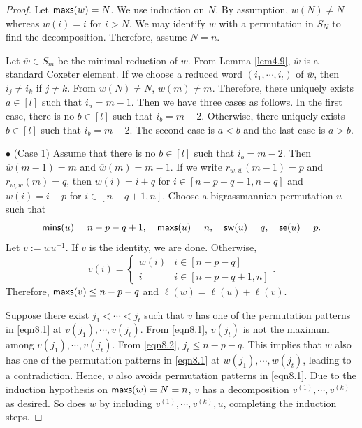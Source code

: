 \documentclass[12pt]{amsart}
\theoremstyle{definition}
\theoremstyle{remark}
\begin{document}
\begin{proof}
Let ${\sf maxs}(w) = N$. We use induction on $N$. By assumption, $w(N) \neq N$ whereas $w(i)= i$ for $i > N$. We may identify $w$ with a permutation in $S_N$ to find the decomposition. Therefore, assume $N = n$.

Let $\overline{w} \in S_m$ be the minimal reduction of $w$. From Lemma \ref{lem4.9}, $\overline{w}$ is a standard Coxeter element. If we choose a reduced word $(i_1 , \cdots , i_l)$ of $\overline{w}$, then $i_j \neq i_k$ if $j \neq k$. From $w(N) \neq N$, $w(m) \neq m$. Therefore, there uniquely exists $a \in [l]$ such that $i_a = m-1$. Then we have three cases as follows. In the first case, there is no $b \in [l]$ such that $i_b = m-2$. Otherwise, there uniquely exists $b \in [l]$ such that $i_b = m-2$. The second case is $a < b$ and the last case is $a > b$.

$\bullet$ (Case 1) Assume that there is no $b \in [l]$ such that $i_b = m-2$. Then $\overline{w}(m-1) = m$ and $\overline{w} (m) = m-1$. If we write $r_{w , \overline{w}} (m-1) = p$ and $r_{w , \overline{w}} (m) = q$, then $w(i) = i+q$ for $i \in [n-p-q+1 , n-q]$ and $w (i) = i-p$ for $i \in [n-q+1 , n]$. Choose a bigrassmannian permutation $u$ such that
\begin{equation}
{\sf mins}(u) = n-p-q+1 , \quad {\sf maxs}(u) = n , \quad {\sf sw}(u) = q, \quad {\sf se}(u) = p.
\end{equation}
Let $v:= w u^{-1}$. If $v$ is the identity, we are done. Otherwise,
\begin{equation}\label{eqn8.2}
v (i) = 
\begin{cases}
w(i) & i \in [n-p-q] \\
i & i \in [n-p-q+1 , n]
\end{cases}
.
\end{equation}
Therefore, ${\sf maxs} (v) \leq n-p-q$ and $\ell (w) = \ell (u) + \ell (v)$. 

Suppose there exist $j_1 < \cdots < j_t$ such that $v$ has one of the permutation patterns in \eqref{eqn8.1} at $v(j_1) , \cdots , v(j_t)$. From \eqref{eqn8.1}, $v(j_t)$ is not the maximum among $v(j_1) , \cdots , v(j_t)$. From \eqref{eqn8.2}, $j_t \leq n-p-q$. This implies that $w$ also has one of the permutation patterns in \eqref{eqn8.1} at $w(j_1) , \cdots , w(j_t)$, leading to a contradiction. Hence, $v$ also avoids permutation patterns in \eqref{eqn8.1}. Due to the induction hypothesis on ${\sf maxs}(w) = N = n$, $v$ has a decomposition $v^{(1)} , \cdots , v^{(k)}$ as desired. So does $w$ by including $v^{(1)} , \cdots , v^{(k)} , u$, completing the induction steps.


\end{proof}
\end{document}
